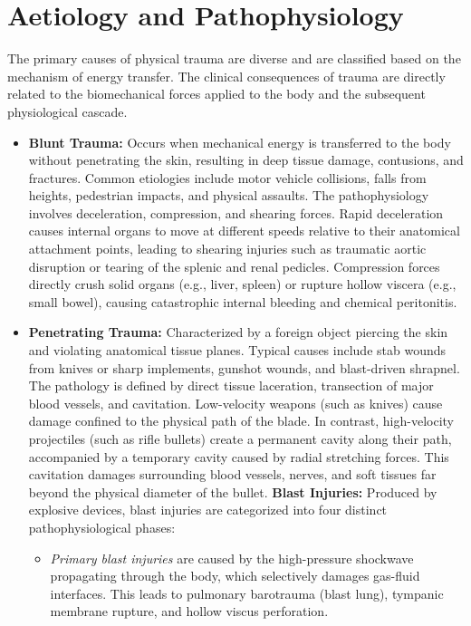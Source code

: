 \section*{Aetiology and Pathophysiology}
The primary causes of physical trauma are diverse and are classified based on the mechanism of energy transfer. The clinical consequences of trauma are directly related to the biomechanical forces applied to the body and the subsequent physiological cascade.
\begin{itemize}
    \item \textbf{Blunt Trauma:} Occurs when mechanical energy is transferred to the body without penetrating the skin, resulting in deep tissue damage, contusions, and fractures. Common etiologies include motor vehicle collisions, falls from heights, pedestrian impacts, and physical assaults. The pathophysiology involves deceleration, compression, and shearing forces. Rapid deceleration causes internal organs to move at different speeds relative to their anatomical attachment points, leading to shearing injuries such as traumatic aortic disruption or tearing of the splenic and renal pedicles. Compression forces directly crush solid organs (e.g., liver, spleen) or rupture hollow viscera (e.g., small bowel), causing catastrophic internal bleeding and chemical peritonitis.
    \item \textbf{Penetrating Trauma:} Characterized by a foreign object piercing the skin and violating anatomical tissue planes. Typical causes include stab wounds from knives or sharp implements, gunshot wounds, and blast-driven shrapnel. The pathology is defined by direct tissue laceration, transection of major blood vessels, and cavitation. Low-velocity weapons (such as knives) cause damage confined to the physical path of the blade. In contrast, high-velocity projectiles (such as rifle bullets) create a permanent cavity along their path, accompanied by a temporary cavity caused by radial stretching forces. This cavitation damages surrounding blood vessels, nerves, and soft tissues far beyond the physical diameter of the bullet.
    \textbf{Blast Injuries:} Produced by explosive devices, blast injuries are categorized into four distinct pathophysiological phases:
    \begin{itemize}
        \item \textit{Primary blast injuries} are caused by the high-pressure shockwave propagating through the body, which selectively damages gas-fluid interfaces. This leads to pulmonary barotrauma (blast lung), tympanic membrane rupture, and hollow viscus perforation.

\end{itemize}
\end{itemize}
